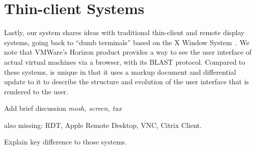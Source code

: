 \section{Thin-client Systems}

Lastly, our system shares ideas with traditional thin-client and remote display 
systems, going back to ``dumb terminals'' based on the X Window 
System~\cite{ScheiflerGettys:acmtg1986}.  We note that VMWare's Horizon product provides
a way to see the user interface of actual virtual machines via a browser, with its
BLAST protocol.  Compared to these systems, \cb{} is 
unique in that it uses a markup document and differential update to it to 
describe the structure and evolution of the user interface that is rendered 
to the user.  

Add brief discussion
\emph{mosh, screen, tux}

also missing: RDT, Apple Remote Desktop, VNC, Citrix Client.

Explain key difference to those systems.

